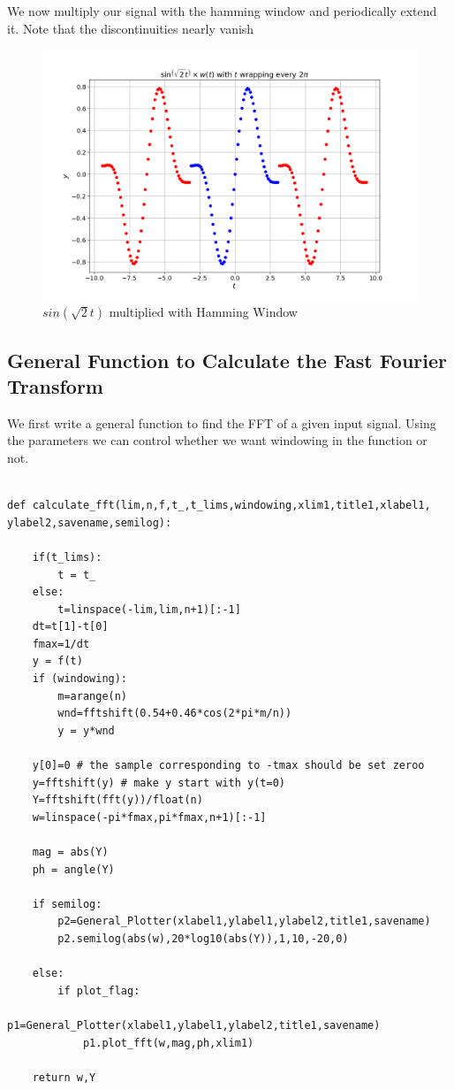 \documentclass{article}
\begin{document}
\noindent
We now multiply our signal with the hamming window and periodically extend it. Note that the discontinuities nearly vanish
\begin{figure}[!tbh]
\centering
\includegraphics[scale=0.4]{plots/windowed_sin.png}
\caption{$sin(\sqrt{2}t)$ multiplied with Hamming Window}
\label{fig:5}
\end{figure}


\subsection{General Function to Calculate the Fast Fourier Transform}

We first write a general function to find the FFT of a given
input signal. Using the parameters we can control whether we want windowing in
the function or not.

\begin{lstlisting}

def calculate_fft(lim,n,f,t_,t_lims,windowing,xlim1,title1,xlabel1, ylabel2,savename,semilog):
    
    if(t_lims):
        t = t_
    else:
        t=linspace(-lim,lim,n+1)[:-1]
    dt=t[1]-t[0]
    fmax=1/dt
    y = f(t)
    if (windowing):
        m=arange(n)
        wnd=fftshift(0.54+0.46*cos(2*pi*m/n))
        y = y*wnd

    y[0]=0 # the sample corresponding to -tmax should be set zeroo
    y=fftshift(y) # make y start with y(t=0)
    Y=fftshift(fft(y))/float(n)
    w=linspace(-pi*fmax,pi*fmax,n+1)[:-1]
    
    mag = abs(Y)
    ph = angle(Y)
    
    if semilog:
        p2=General_Plotter(xlabel1,ylabel1,ylabel2,title1,savename)
        p2.semilog(abs(w),20*log10(abs(Y)),1,10,-20,0)

    else:
        if plot_flag:
            p1=General_Plotter(xlabel1,ylabel1,ylabel2,title1,savename)
            p1.plot_fft(w,mag,ph,xlim1)

    return w,Y

\end{lstlisting}
\end{document}
